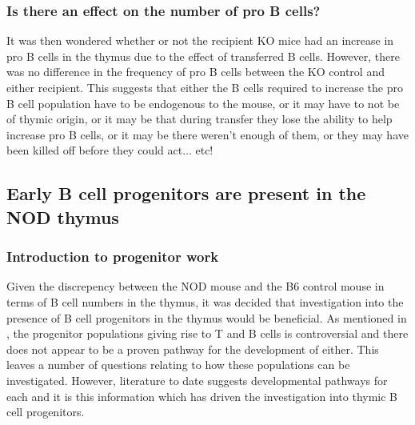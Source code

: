 
\subsubsection{Is there an effect on the number of pro B cells?}

It was then wondered whether or not the recipient KO mice had an increase in pro B cells in the thymus due to the effect of transferred B cells.
However, there was no difference in the frequency of pro B cells between the KO control and either recipient.
This suggests that either the B cells required to increase the pro B cell population have to be endogenous to the mouse, or it may have to not be of thymic origin, or it may be that during transfer they lose the ability to help increase pro B cells, or it may be there weren't enough of them, or they may have been killed off before they could act... etc!



\subsection{Early B cell progenitors are present in the NOD thymus}

\subsubsection{Introduction to progenitor work}

Given the discrepency between the NOD mouse and the B6 control mouse in terms of B cell numbers in the thymus, it was decided that investigation into the presence of B cell progenitors in the thymus would be beneficial.
As mentioned in , the progenitor populations giving rise to T and B cells is controversial and there does not appear to be a proven pathway for the development of either.
This leaves a number of questions relating to how these populations can be investigated.
However, literature to date suggests developmental pathways for each and it is this information which has driven the investigation into thymic B cell progenitors.

